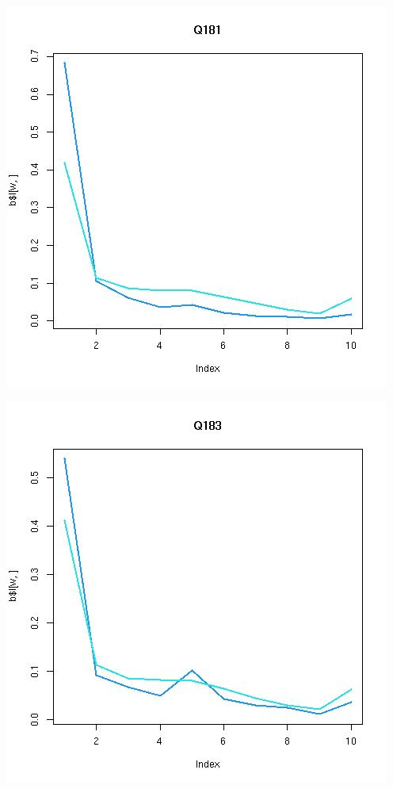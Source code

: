 \documentclass{amsart}
\begin{document}
\includegraphics[scale=0.6]{fitQ181.jpeg}

\includegraphics[scale=0.6]{fitQ183.jpeg}
\end{document}
